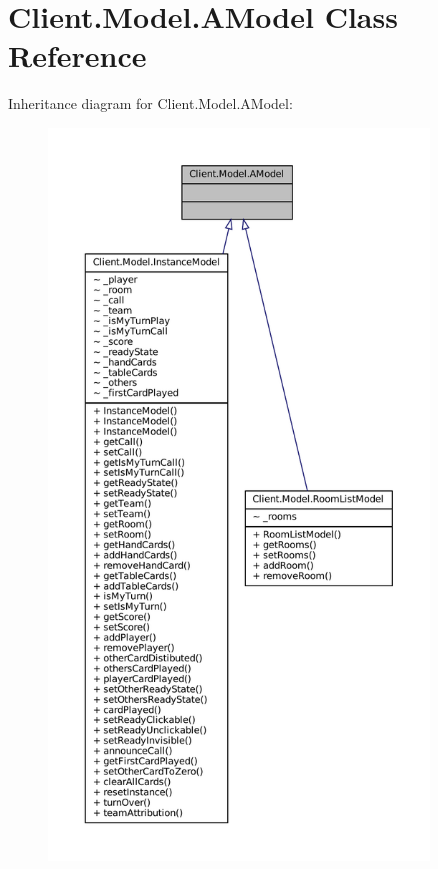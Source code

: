 \hypertarget{classClient_1_1Model_1_1AModel}{}\section{Client.\+Model.\+A\+Model Class Reference}
\label{classClient_1_1Model_1_1AModel}


Inheritance diagram for Client.\+Model.\+A\+Model\+:
\nopagebreak
\begin{figure}[H]
\begin{center}
\leavevmode
\includegraphics[height=550pt]{classClient_1_1Model_1_1AModel__inherit__graph}
\end{center}
\end{figure}


